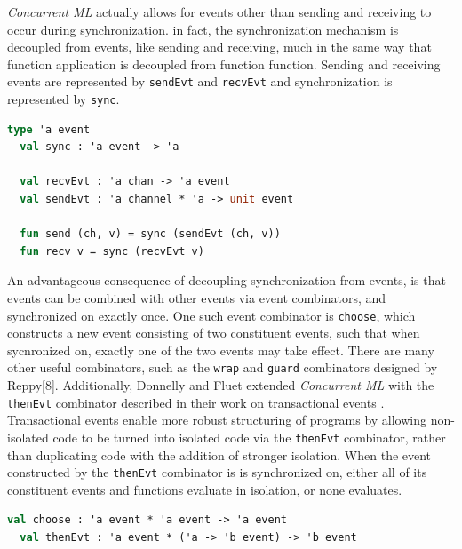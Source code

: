\documentclass[10pt]{article}
\begin{document}
\textit{Concurrent ML} actually allows for events other than sending and receiving to
occur during synchronization. in fact, the synchronization mechanism is decoupled from
events, like sending and receiving, much in the same way that function application is decoupled
from function function. Sending and receiving events are represented by \lstinline{sendEvt}
and \lstinline{recvEvt} and synchronization is represented by \lstinline{sync}.

\begin{lstlisting}[language=ML, mathescape]
  type 'a event
  val sync : 'a event -> 'a

  val recvEvt : 'a chan -> 'a event
  val sendEvt : 'a channel * 'a -> unit event

  fun send (ch, v) = sync (sendEvt (ch, v))
  fun recv v = sync (recvEvt v)
\end{lstlisting}

An advantageous consequence of decoupling synchronization from events, is that events can be
combined with other events via event combinators, and synchronized on exactly once. One such
event combinator is \lstinline{choose}, which constructs a new event consisting of two
constituent events, such that when sycnronized on, exactly one of the two events may take
effect. There are many other useful combinators, such as the \lstinline{wrap} and
\lstinline{guard} combinators designed by Reppy[8]. Additionally, Donnelly and Fluet extended
\textit{Concurrent ML} with the \lstinline{thenEvt} combinator described in their work on
transactional events \cite{transactional_events}. Transactional events enable more robust
structuring of programs by allowing non-isolated code to be turned into isolated code via
the \lstinline{thenEvt} combinator, rather than duplicating code with the addition of stronger
isolation. When the event constructed by the \lstinline{thenEvt} combinator is is synchronized
on, either all of its constituent events and functions evaluate in isolation, or none
evaluates.

\begin{lstlisting}[language=ML, mathescape]
  val choose : 'a event * 'a event -> 'a event
  val thenEvt : 'a event * ('a -> 'b event) -> 'b event
  \end{lstlisting}
\end{document}
